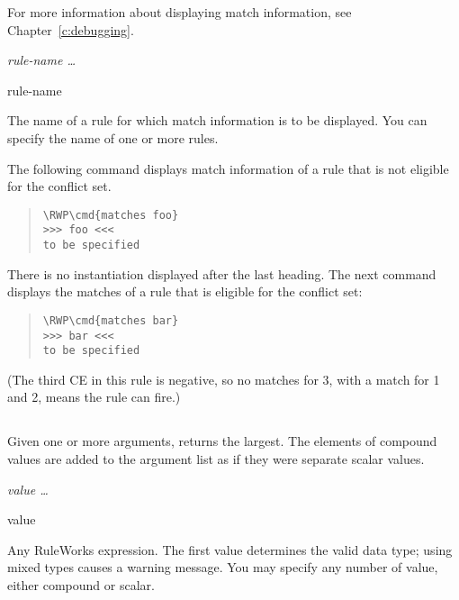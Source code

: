For more information about displaying match information, see
Chapter~\ref{c:debugging}.

\Format

 \it{rule-name} \ldots

\begin{arguments}
\item[rule-name]

  The name of a rule for which match information is to be
  displayed. You can specify the name of one or more rules.
\end{arguments}

\Example

The following command displays match information of a rule that is not
eligible for the conflict set.

\begin{quote}
\begin{Verbatim}[commandchars=\\\{\}]
\RWP\cmd{matches foo}
>>> foo <<<
to be specified
\end{Verbatim}
\end{quote}

\begin{note}
  There is no instantiation displayed after the last heading. The next
  command displays the matches of a rule that is eligible for the
  conflict set:
\end{note}

\begin{quote}
\begin{Verbatim}[commandchars=\\\{\}]
\RWP\cmd{matches bar}
>>> bar <<<
to be specified
\end{Verbatim}
\end{quote}

(The third CE in this rule is negative, so no matches for 3, with a
match for 1 and 2, means the rule can fire.)

\subsection{}

Given one or more arguments, returns the largest. The
elements of compound values are added to the argument list as
if they were separate scalar values.

\Format

 \it{value} \ldots

\begin{arguments}

\item[value]

  Any RuleWorks expression. The first value determines the valid data
  type; using mixed types causes a warning message.  You may specify
  any number of value, either compound or scalar.
\end{arguments}

